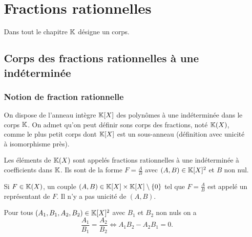 \chapter{Fractions rationnelles}
\label{chap:fractionrationnelles}
\minitoc
\minilof
\minilot

Dans tout le chapitre \(\mathbb{K}\) désigne un corps.

\section{Corps des fractions rationnelles à une indéterminée}

\subsection{Notion de fraction rationnelle}

On dispose de l'anneau intègre \(\mathbb{K}[X]\) des polynômes à une indéterminée dans le corps \(\mathbb{K}\). On admet qu'on peut définir sons corps des fractions, noté \(\mathbb{K}(X)\), comme le plus petit corps dont \(\mathbb{K}[X]\) est un sous-anneau (définition avec unicité à isomorphisme près).

Les éléments de \(\mathbb{K}(X)\) sont appelés fractions rationnelles à une indéterminée à coefficients dans \(\mathbb{K}\). Ils sont de la forme \(F=\frac{A}{B}\) avec \((A,B) \in \mathbb{K}[X]^2\) et \(B\) non nul.

Si \(F \in \mathbb{K}(X)\), un couple  \((A,B) \in \mathbb{K}[X]\times \mathbb{K}[X]\setminus\{0\}\) tel que \(F=\frac{A}{B}\) est appelé un représentant de \(F\). Il n'y a pas unicité de \((A,B)\).

Pour tous \((A_1,B_1,A_2,B_2) \in \mathbb{K}[X]^2\) avec \(B_1\) et \(B_2\) non nuls on a
\begin{equation}
  \frac{A_1}{B_1} = \frac{A_2}{B_2}   \iff A_1B_2 -A_2B_1 =0.
\end{equation}

